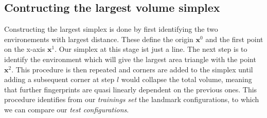 \subsection{Contructing the largest volume simplex}
Constructing the largest simplex is done by first identifying the two environements with largest distance. These define the origin $\mathbf{x}^0$ and the first point on the x-axis $\mathbf{x}^1$. Our simplex at this stage ist just a line. The next step is to identify the environment which will give the largest area triangle with the point $\mathbf{x}^2$. This procedure is then repeated and corners are added to the simplex until adding a subsequent corner at step $l$ would collapse the total volume, meaning that further fingerprints are quasi linearly dependent on the previous ones. This procedure identifies from our \emph{trainings set} the landmark configurations, to which we can compare our \emph{test configurations}.